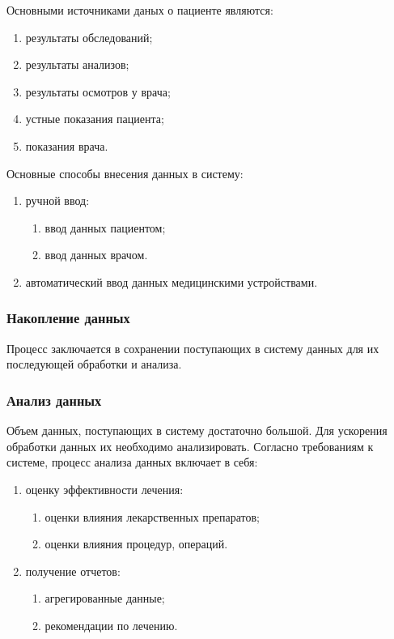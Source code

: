 Основными источниками даных о пациенте являются:

\begin{enumerate}
  \item результаты обследований;
  \item результаты анализов;
  \item результаты осмотров у врача;
  \item устные показания пациента;
  \item показания врача. 
\end{enumerate}

Основные способы внесения данных в систему:

\begin{enumerate}
  \item ручной ввод:
  \begin{enumerate}
    \item ввод данных пациентом;
    \item ввод данных врачом.
  \end{enumerate}
  \item автоматический ввод данных медицинскими устройствами.
\end{enumerate}

\subsubsection{Накопление данных}
Процесс заключается в сохранении поступающих в систему данных для их последующей
обработки и анализа.

\subsubsection{Анализ данных}
Объем данных, поступающих в систему достаточно большой. Для ускорения обработки
данных их необходимо анализировать. Согласно требованиям к системе, процесс
анализа данных включает в себя:

\begin{enumerate}
  \item оценку эффективности лечения:
  \begin{enumerate}
    \item оценки влияния лекарственных препаратов;
    \item оценки влияния процедур, операций. 
  \end{enumerate}
  \item получение отчетов:
  \begin{enumerate}
    \item агрегированные данные;
    \item рекомендации по лечению.
  \end{enumerate}  
\end{enumerate}










